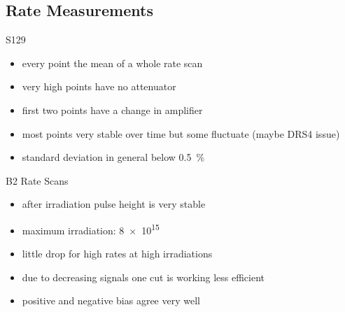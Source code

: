 \subsection{Rate Measurements}
\begin{frame}{S129}

	\vspace*{-2ex}
	\vspace*{-1ex}
	
	\begin{itemize}\itemfill
		\item<1-> every point the mean of a whole rate scan
		\item<1-> very high points have no attenuator
		\item<1-> first two points have a change in amplifier
		\item<2-> most points very stable over time but some fluctuate (maybe DRS4 issue)
		\item<3-> standard deviation in general below \SI{.5}{\%}
	\end{itemize}

\end{frame}
\begin{frame}{B2 Rate Scans}

	\begin{minipage}[c][.7\textheight]{.34\textwidth}
		\begin{itemize}\itemfill
			\item after irradiation pulse height is very stable
			\item maximum irradiation: \SI{8e15}{\ncm}
			\item little drop for high rates at high irradiations 
			\item \ra due to decreasing signals one cut is working less efficient
			\item<2> positive and negative bias agree very well
		\end{itemize}
	\end{minipage}\hfill
	\begin{minipage}{.63\textwidth}
	\end{minipage}
	
\end{frame}
